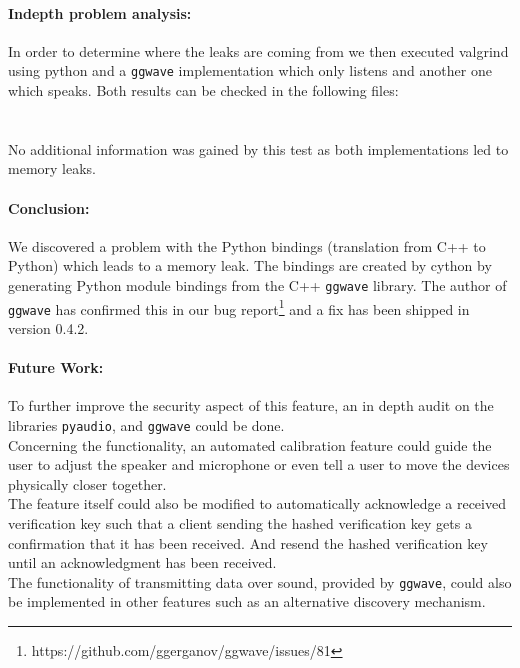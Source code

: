 \documentclass[a4paper,11pt]{report}
\begin{document}
\paragraph*{Indepth problem analysis:}
In order to determine where the leaks are coming from we then executed valgrind using python and a \texttt{ggwave} implementation which only listens and another one which speaks.
Both results can be checked in the following files:
\\
\\
\\
No additional information was gained by this test as both implementations led to memory leaks.

\paragraph*{Conclusion:} We discovered a problem with the Python bindings (translation from C++ to Python) which leads to a memory leak. The bindings are created by cython by generating Python module bindings from the C++ \texttt{ggwave} library. The author of \texttt{ggwave} has confirmed this in our bug report\footnote[2]{https://github.com/ggerganov/ggwave/issues/81} and a fix has been shipped in version 0.4.2.

\paragraph*{Future Work:}
To further improve the security aspect of this feature, an in depth audit on the libraries \texttt{pyaudio}, and \texttt{ggwave} could be done.
\\
Concerning the functionality, an automated calibration feature could guide the user to adjust the speaker and microphone or even tell a user to move the devices physically closer together.
\\
The feature itself could also be modified to automatically acknowledge a received verification key such that a client sending the hashed verification key gets a confirmation that it has been received. And resend the hashed verification key until an acknowledgment has been received.
\\
The functionality of transmitting data over sound, provided by \texttt{ggwave}, could also be implemented in other features such as an alternative discovery mechanism.
\end{document}
